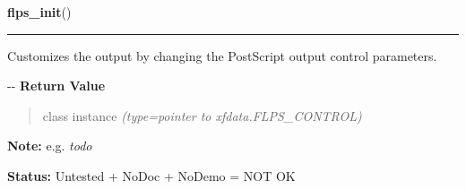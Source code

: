     \label{xformslib:flmisc:flps_init}

    \vspace{0.5ex}

\hspace{.8\funcindent}\begin{boxedminipage}{\funcwidth}

    \raggedright \textbf{flps\_init}()

    \vspace{-1.5ex}

    \rule{\textwidth}{0.5\fboxrule}
\setlength{\parskip}{2ex}

Customizes the output by changing the PostScript output control
parameters.

-{}-
\setlength{\parskip}{1ex}
      \textbf{Return Value}
    \vspace{-1ex}

      \begin{quote}

class instance
      {\it (type=pointer to xfdata.FLPS\_CONTROL)}

      \end{quote}

\textbf{Note:} 
e.g. \emph{todo}


\textbf{Status:} 
Untested + NoDoc + NoDemo = NOT OK


    \end{boxedminipage}

    \label{xformslib:flmisc:fl_object_ps_dump}

    \vspace{0.5ex}

